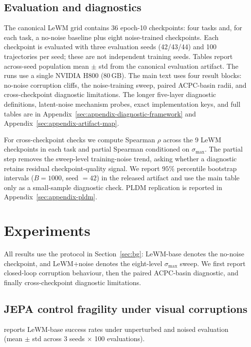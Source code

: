 \documentclass[10pt]{article}
\newcommand{\stdmax}{\ensuremath{\sigma_{\max}}}
\begin{document}
\subsection{Evaluation and diagnostics}\label{sec:bg-protocol}

The canonical LeWM grid contains 36 epoch-10 checkpoints: four tasks and, for each task, a no-noise baseline plus eight noise-trained checkpoints. Each checkpoint is evaluated with three evaluation seeds (42/43/44) and 100 trajectories per seed; these are not independent training seeds. Tables report across-seed population mean $\pm$ std from the canonical evaluation artifact. The runs use a single NVIDIA H800 (80\,GB). The main text uses four result blocks: no-noise corruption cliffs, the noise-training sweep, paired ACPC-basin radii, and cross-checkpoint diagnostic limitations. The longer five-layer diagnostic definitions, latent-noise mechanism probes, exact implementation keys, and full tables are in Appendix~\ref{sec:appendix-diagnostic-framework} and Appendix~\ref{sec:appendix-artifact-map}.

For cross-checkpoint checks we compute Spearman $\rho$ across the 9 LeWM checkpoints in each task and partial Spearman conditioned on \stdmax{}. The partial step removes the sweep-level training-noise trend, asking whether a diagnostic retains residual checkpoint-quality signal. We report $95\%$ percentile bootstrap intervals ($B = 1000$, seed $=42$) in the released artifact and use the main table only as a small-sample diagnostic check. PLDM replication is reported in Appendix~\ref{sec:appendix-pldm}.

\section{Experiments}\label{sec:exp}

All results use the protocol in Section~\ref{sec:bg}: LeWM-base denotes the no-noise checkpoint, and LeWM+noise denotes the eight-level \stdmax{} sweep. We first report closed-loop corruption behaviour, then the paired ACPC-basin diagnostic, and finally cross-checkpoint diagnostic limitations.

\subsection{JEPA control fragility under visual corruptions}\label{sec:exp-cliff}

 reports LeWM-base success rates under unperturbed and noised evaluation (mean $\pm$ std across 3 seeds $\times$ 100 evaluations).
\end{document}
